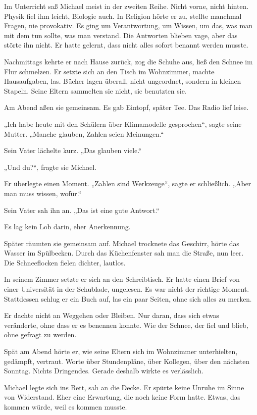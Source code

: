 \documentclass[
]{article}
\begin{document}
Im Unterricht saß Michael meist in der zweiten Reihe. Nicht vorne, nicht hinten. Physik fiel ihm leicht, Biologie auch. In Religion hörte er zu, stellte manchmal Fragen, nie provokativ. Es ging um Verantwortung, um Wissen, um das, was man mit dem tun sollte, was man verstand. Die Antworten blieben vage, aber das störte ihn nicht. Er hatte gelernt, dass nicht alles sofort benannt werden musste.

Nachmittags kehrte er nach Hause zurück, zog die Schuhe aus, ließ den Schnee im Flur schmelzen. Er setzte sich an den Tisch im Wohnzimmer, machte Hausaufgaben, las. Bücher lagen überall, nicht ungeordnet, sondern in kleinen Stapeln. Seine Eltern sammelten sie nicht, sie benutzten sie.

Am Abend aßen sie gemeinsam. Es gab Eintopf, später Tee. Das Radio lief leise.

„Ich habe heute mit den Schülern über Klimamodelle gesprochen``, sagte seine Mutter. „Manche glauben, Zahlen seien Meinungen.``

Sein Vater lächelte kurz. „Das glauben viele.``

„Und du?{\kern0pt}``, fragte sie Michael.

Er überlegte einen Moment. „Zahlen sind Werkzeuge``, sagte er schließlich. „Aber man muss wissen, wofür.``

Sein Vater sah ihn an. „Das ist eine gute Antwort.``

Es lag kein Lob darin, eher Anerkennung.

Später räumten sie gemeinsam auf. Michael trocknete das Geschirr, hörte das Wasser im Spülbecken. Durch das Küchenfenster sah man die Straße, nun leer. Die Schneeflocken fielen dichter, lautlos.

In seinem Zimmer setzte er sich an den Schreibtisch. Er hatte einen Brief von einer Universität in der Schublade, ungelesen. Es war nicht der richtige Moment. Stattdessen schlug er ein Buch auf, las ein paar Seiten, ohne sich alles zu merken.

Er dachte nicht an Weggehen oder Bleiben. Nur daran, dass sich etwas veränderte, ohne dass er es benennen konnte. Wie der Schnee, der fiel und blieb, ohne gefragt zu werden.

Spät am Abend hörte er, wie seine Eltern sich im Wohnzimmer unterhielten, gedämpft, vertraut. Worte über Stundenpläne, über Kollegen, über den nächsten Sonntag. Nichts Dringendes. Gerade deshalb wirkte es verlässlich.

Michael legte sich ins Bett, sah an die Decke. Er spürte keine Unruhe im Sinne von Widerstand. Eher eine Erwartung, die noch keine Form hatte. Etwas, das kommen würde, weil es kommen musste.
\end{document}

